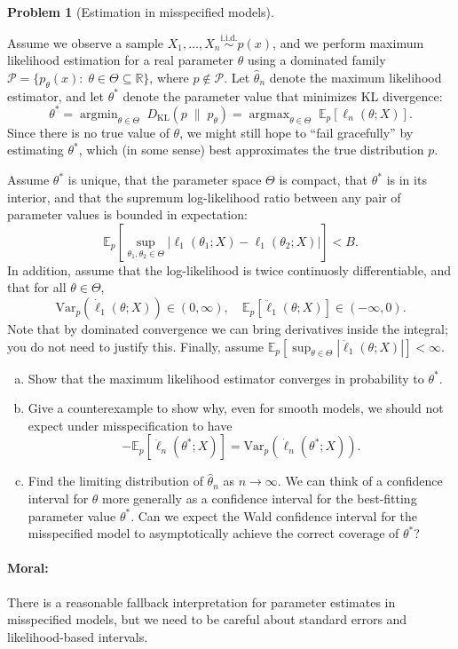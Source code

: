 \documentclass{article}
\newcommand{\cP}{\mathcal{P}}
\newcommand{\EE}{\mathbb{E}}
\newcommand{\RR}{\mathbb{R}}
\DeclareMathOperator*{\argmax}{argmax}
\DeclareMathOperator*{\argmin}{argmin}
\newcommand{\simiid}{\overset{\text{i.i.d.}}{\sim}}
\theoremstyle{definition}
\newtheorem{problem}{Problem}
\begin{document}
\begin{problem}[Estimation in misspecified models]
\label{prob:misspecified}

Assume we observe a sample $X_1,\ldots,X_n \simiid p(x)$, and we perform maximum likelihood estimation for a real parameter $\theta$ using a dominated family $\cP = \{p_{\theta}(x):\; \theta\in\Theta \subseteq \RR\}$, where $p\notin\cP$. Let $\hat\theta_n$ denote the maximum likelihood estimator, and let $\theta^*$ denote the parameter value that minimizes KL divergence:
\[
\theta^* = \argmin_{\theta\in\Theta} \;D_{\text{KL}}(p \;\|\; p_{\theta})
= \argmax_{\theta\in\Theta}\; \EE_p\left[\ell_n(\theta; X)\right].
\]
Since there is no true value of $\theta$, we might still hope to ``fail gracefully'' by estimating $\theta^*$, which (in some sense) best approximates the true distribution $p$.

Assume $\theta^*$ is unique, that the parameter space $\Theta$ is compact, that $\theta^*$ is in its interior, and that the supremum log-likelihood ratio between any pair of parameter values is bounded in expectation:
\[
\EE_p\left[\sup_{\theta_1,\theta_2\in\Theta}|\ell_1(\theta_1; X) - \ell_1(\theta_2; X)|\right] < B.
\]
In addition, assume that the log-likelihood is twice continuosly differentiable, and that for all $\theta\in\Theta$,
\[
\text{Var}_p(\dot{\ell}_1(\theta;X)) \in (0,\infty), \quad \EE_p\left[\ddot{\ell}_1(\theta;X)\right] \in (-\infty,0).
\]
Note that by dominated convergence we can bring derivatives inside the integral; you do not need to justify this. Finally, assume $\EE_p\left[\sup_{\theta\in\Theta} |\ddot{\ell}_1(\theta;X)|\right]<\infty$.

\begin{enumerate}[(a)]
\item Show that the maximum likelihood estimator converges in probability to $\theta^*$.



\item Give a counterexample to show why, even for smooth models, we should not expect under misspecification to have
\[
-\EE_p [\ddot{\ell}_n(\theta^*;X)] = \text{Var}_p(\dot{\ell}_n(\theta^*;X)).
\]



\item Find the limiting distribution of $\hat\theta_n$ as $n \to \infty$. We can think of a confidence interval for $\theta$ more generally as a confidence interval for the best-fitting parameter value $\theta^*$. Can we expect the Wald confidence interval for the misspecified model to asymptotically achieve the correct coverage of $\theta^*$?



\end{enumerate}

\paragraph{Moral:} There is a reasonable fallback interpretation for parameter estimates in misspecified models, but we need to be careful about standard errors and likelihood-based intervals.


\end{problem}





\end{document}

